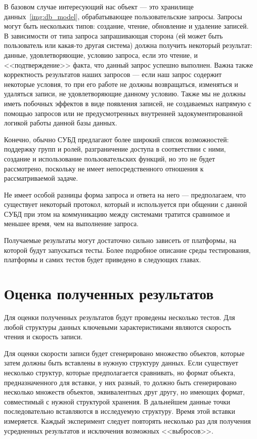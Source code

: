 В базовом случае интересующий нас объект --- это хранилище данных~\ref{img:db_model},
обрабатывающее пользовательские запросы. Запросы могут быть
нескольких типов: создание, чтение, обновление и удаление записей.
В зависимости от типа запроса запрашивающая сторона (ей может быть пользователь
или какая-то другая система) должна получить некоторый результат: данные,
удовлетворяющие, условию запроса, если это чтение, и <<подтверждение>> факта, что
данный запрос успешно выполнен.
Важна также корректность результатов наших запросов — если наш запрос
содержит некоторые условия, то при его работе не должны возвращаться,
изменяться и удаляться записи, не удовлетворяющие данному условию. Также
мы не должны иметь побочных эффектов в виде появления записей,
не создаваемых напрямую с помощью запросов или не предусмотренных внутренней
задокументированной логикой работы данной базы данных.

Конечно, обычно СУБД предлагают более широкий список возможностей:
поддержку групп и ролей, разграничение доступа в соответствии с ними, создание и использование пользовательских функций,
но это не будет рассмотрено, поскольку не имеет
непосредственного отношения к рассматриваемой задаче.

Не имеет особой разницы форма запроса и ответа на него ---
предполагаем, что существует некоторый протокол, который и используется при общении
с данной СУБД при этом на коммуникацию между системами
тратится сравнимое и меньшее время, чем на выполнение запроса.

Получаемые результаты могут достаточно сильно зависеть от платформы,
на которой будут запускаться тесты.
Более подробное описание среды тестирования,
платформы и самих тестов
будет приведено в следующих главах.

\section{Оценка полученных результатов}

Для оценки полученных результатов будут проведены несколько тестов.
Для любой структуры данных ключевыми характеристиками являются
скорость чтения и скорость записи.

Для оценки скорости записи будет сгенерировано множество объектов,
которые затем должны быть вставлены в нужную структуру данных.
Если существует несколько структур, которые предполагается сравнивать,
но формат объекта, предназначенного для вставки, у них разный,
то должно быть сгенерировано несколько множеств объектов,
эквивалентных друг другу, но имеющих формат, совместимый с нужной структурой хранения.
В дальнейшем данные точки последовательно вставляются в исследуемую структуру. Время этой вставки измеряется.
Каждый эксперимент следует повторять несколько раз для получения усредненных результатов и исключения возможных <<выбросов>>.


